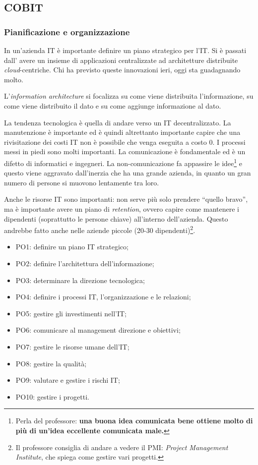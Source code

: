 \subsection{COBIT}
\label{COBIT}

\subsubsection{Pianificazione e organizzazione}

In un'azienda IT è importante definire un piano strategico per l'IT. Si è passati dall'
avere un insieme di applicazioni centralizzate ad architetture distribuite 
\textit{cloud}-centriche. Chi ha previsto queste innovazioni ieri, oggi sta 
guadagnando molto.

L'\textit{information architecture} si focalizza su come viene distribuita 
l'informazione, su come viene distribuito il dato e su come aggiunge 
informazione al dato.

La tendenza tecnologica è quella di andare verso un IT decentralizzato. La 
manutenzione è importante ed è quindi altrettanto importante capire che una rivisitazione 
dei costi IT non è possibile che venga eseguita a costo 0. I processi messi in piedi sono 
molti importanti. La comunicazione è fondamentale ed è un difetto di 
informatici e ingegneri. La non-comunicazione fa appassire le 
idee\footnote{Perla del professore: \textbf{una buona idea comunicata bene 
ottiene molto di più di un'idea eccellente comunicata male.}} e questo viene 
aggravato dall'inerzia che ha una grande azienda, in quanto un gran numero di 
persone si muovono lentamente tra loro.

Anche le risorse IT sono importanti: non serve più solo prendere ``quello 
bravo'', ma è importante avere un piano di \textit{retention}, ovvero capire 
come mantenere i dipendenti (soprattutto le persone chiave) all'interno 
dell'azienda. Questo andrebbe fatto anche nelle aziende piccole (20-30 
dipendenti)\footnote{Il professore consiglia di andare a vedere il PMI: 
\textit{Project Management Institute}, che spiega come gestire vari progetti.}.

\begin{itemize}
\item PO1: definire un piano IT strategico;
\item PO2: definire l'architettura dell'informazione;
\item PO3: determinare la direzione tecnologica;
\item PO4: definire i processi IT, l'organizzazione e le relazioni;
\item PO5: gestire gli investimenti nell'IT;
\item PO6: comunicare al management direzione e obiettivi;
\item PO7: gestire le risorse umane dell'IT;
\item PO8: gestire la qualità;
\item PO9: valutare e gestire i rischi IT; 
\item PO10: gestire i progetti.

\end{itemize}


